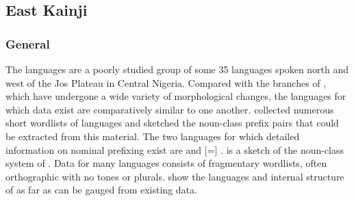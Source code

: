 \documentclass[output=paper]{langsci/langscibook}
\begin{document}
\subsection{East Kainji}
\subsubsection{General}
The  languages are a poorly studied group of some 35 languages spoken north and west of the Jos Plateau in Central Nigeria. Compared with the branches of , which have undergone a wide variety of morphological changes, the  languages for which data exist are comparatively similar to one another. \citet{Shimizu1979,Shimizu1982wordlists,Shimizu1982nord} collected numerous short wordlists of  languages and sketched the noun-class prefix pairs that could be extracted from this material. The two languages for which detailed information on nominal prefixing exist are  \citep{DiLuzio1972,Anderson1980} and  [=] \citep{BlenchBLCunpublished}. \citet{Shimizu1968} is a sketch of the noun-class system of . Data for many languages consists of fragmentary wordlists, often orthographic with no tones or plurals.  show the languages and internal structure of  as far as can be gauged from existing data.%
\end{document}
